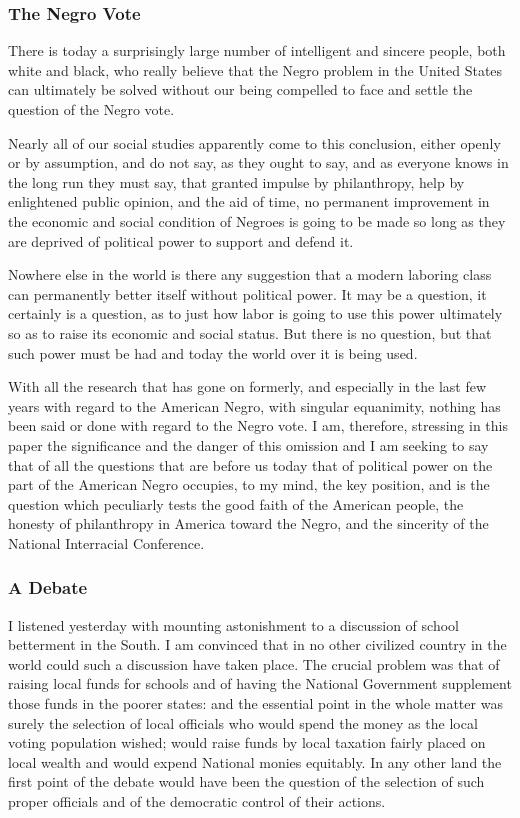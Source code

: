 \documentclass[letterpaper,10pt,english]{jupyterBook}
\begin{document}
\subsubsection{The Negro Vote}
\label{\detokenize{Volumes/36/05/negro_citizen:the-negro-vote}}
\sphinxAtStartPar
There is today a surprisingly large number of intelligent and sincere people, both white and black, who really believe that the Negro problem in the United States can ultimately be solved without our being compelled to face and settle the question of the Negro vote.

\sphinxAtStartPar
Nearly all of our social studies apparently come to this conclusion, either openly or by assumption, and do not say, as they ought to say, and as everyone knows in the long run they must say, that granted impulse by philanthropy, help by enlightened public opinion, and the aid of time, no permanent improvement in the economic and social condition of Negroes is going to be made so long as they are deprived of political power to support and defend it.

\sphinxAtStartPar
Nowhere else in the world is there any suggestion that a modern laboring class can permanently better itself without political power. It may be a question, it certainly is a question, as to just how labor is going to use this power ultimately so as to raise its economic and social status. But there is no question, but that such power must be had and today the world over it is being used.

\sphinxAtStartPar
With all the research that has gone on formerly, and especially in the last few years with regard to the American Negro, with singular equanimity, nothing has been said or done with regard to the Negro vote. I am, therefore, stressing in this paper the significance and the danger of this omission and I am seeking to say that of all the questions that are before us today that of political power on the part of the American Negro occupies, to my mind, the key position, and is the question which peculiarly tests the good faith of the American people, the honesty of philanthropy in America toward the Negro, and the sincerity of the National Inter\sphinxhyphen{}racial Conference.


\subsubsection{A Debate}
\label{\detokenize{Volumes/36/05/negro_citizen:a-debate}}
\sphinxAtStartPar
I listened yesterday with mounting astonishment to a discussion of school betterment in the South. I am convinced that in no other civilized country in the world could such a discussion have taken place. The crucial problem was that of raising local funds for schools and of having the National Government supplement those funds in the poorer states: and the essential point in the whole matter was surely the selection of local officials who would spend the money as the local voting population wished; would raise funds by local taxation fairly placed on local wealth and would expend National monies equitably. In any other land the first point of the debate would have been the question of the selection of such proper officials and of the democratic control of their actions.
\end{document}

